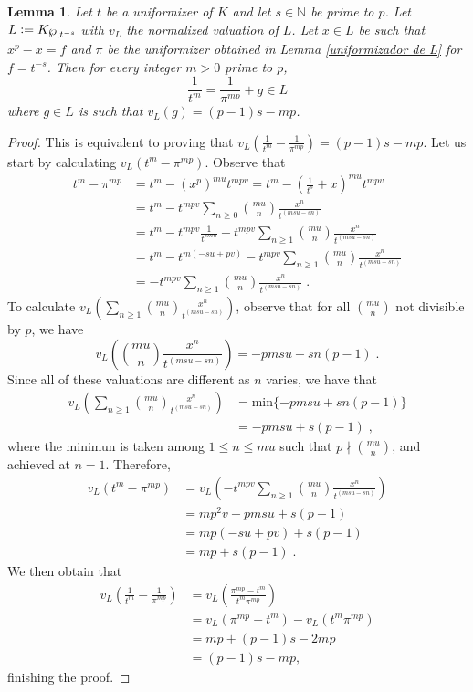 \documentclass[10pt,a4paper]{amsart}
\newtheorem{lemma}{Lemma}
\newcommand{\defeq}{\vcentcolon=}
\renewcommand{\geq}{\geqslant}
\renewcommand{\leq}{\leqslant}
\renewcommand{\wp}{\ensuremath\raisebox{\depth}{$\mathchar"17D$}}
\begin{document}
\begin{lemma}\label{t em funcao de pi}
    Let $t$ be a uniformizer of $K$ and let $s\in \mathbb{N}$ be prime to $p$. Let $L\defeq K_{\wp, t^{-s}}$ with $v_{L}$ the normalized valuation of $L$. Let $x\in L$ be such that $x^{p}-x=f$ and $\pi$ be the uniformizer obtained in Lemma \ref{uniformizador de L} for $f=t^{-s}$. Then for every integer $m>0$ prime to $p$,
    \[
    \frac{1}{t^{m}}=\frac{1}{\pi^{mp}}+g\in L
    \]
    where $g\in L$ is such that $v_{L}(g)=(p-1)s-mp$.
\end{lemma}

\begin{proof}
    This is equivalent to proving that $v_{L}\left(\frac{1}{t^{m}}-\frac{1}{\pi^{mp}}\right)=(p-1)s-mp$.
    Let us start by calculating $v_{L}(t^{m}-\pi^{mp})$. Observe that
    \begin{align*}
        t^{m}-\pi^{mp} &=t^{m}-(x^{p})^{mu}t^{mpv}=t^{m}-\left(\frac{1}{t^{s}}+x\right)^{mu}t^{mpv}\;
        \\
        &=t^{m}-t^{mpv}\sum_{n\geq 0}\binom{mu}{n}\frac{x^{n}}{t^{(msu-sn)}}
        \\
        &=t^{m}-t^{mpv}\frac{1}{t^{smu}}-t^{mpv}\sum_{n\geq 1}\binom{mu}{n}\frac{x^{n}}{t^{(msu-sn)}}
        \\
        &=t^{m}-t^{m(-su+pv)}-t^{mpv}\sum_{n\geq 1}\binom{mu}{n}\frac{x^{n}}{t^{(msu-sn)}}
        \\
        &=-t^{mpv}\sum_{n\geq 1}\binom{mu}{n}\frac{x^{n}}{t^{(msu-sn)}}\;.
    \end{align*}
    To calculate $v_{L}(\sum_{n\geq 1}\binom{mu}{n}\frac{x^{n}}{t^{(msu-sn)}})$, observe that for all $\binom{mu}{n}$ not divisible by $p$, we have
    \[
    v_{L}\left(\binom{mu}{n}\frac{x^{n}}{t^{(msu-sn)}}\right)=-pmsu+sn(p-1)\;.
    \]
    Since all of these valuations are different as $n$ varies, we have that
    \begin{align*}
        v_{L}\left(\sum_{n\geq 1}\binom{mu}{n}\frac{x^{n}}{t^{(msu-sn)}}\right) &=\text{min}\{-pmsu+sn(p-1)\}
        \\
        &=-pmsu+s(p-1)\;,
    \end{align*}
    where the minimun is taken among $1\leq n\leq mu$ such that $p\nmid \binom{mu}{n}$, and achieved at $n=1$. Therefore, 
    \begin{align*}
        v_{L}(t^{m}-\pi^{mp}) &=v_{L}(-t^{mpv}\sum_{n\geq 1}\binom{mu}{n}\frac{x^{n}}{t^{(msu-sn)}})
        \\
        &=mp^{2}v-pmsu+s(p-1)
        \\
        &=mp(-su+pv)+s(p-1)
        \\
        &=mp+s(p-1)\;.
    \end{align*}
    We then obtain that
    \begin{align*}
        v_{L}\left(\frac{1}{t^{m}}-\frac{1}{\pi^{mp}}\right)&=v_{L}\left(\frac{\pi^{mp}-t^{m}}{t^{m}\pi^{mp}}\right)
        \\
        &=v_{L}(\pi^{mp}-t^{m})-v_{L}(t^{m}\pi^{mp})
        \\
        &=mp+(p-1)s-2mp
        \\
        &=(p-1)s-mp,
    \end{align*}
    finishing the proof.
\end{proof}
\end{document}
